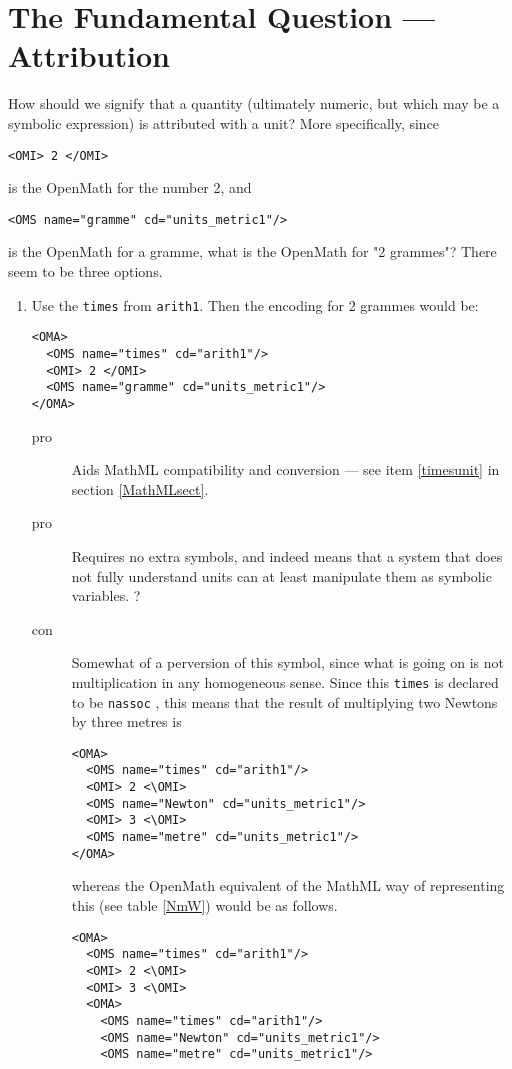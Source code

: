 \documentclass[11pt]{openmathTN}
\begin{document}
\section{The Fundamental Question --- Attribution}\label{attributed}
How should we signify that a quantity (ultimately numeric, but which may be
a symbolic expression) is attributed with a unit? More specifically, since
\begin{verbatim}
<OMI> 2 </OMI>
\end{verbatim}
is the OpenMath for the number 2, and
\begin{verbatim}
<OMS name="gramme" cd="units_metric1"/>
\end{verbatim}
is the OpenMath for a gramme, what is the OpenMath for "2 grammes"? There
seem to be three options.
\begin{enumerate}
\item\label{timesoption}Use the {\tt times} from {\tt arith1}. Then
  the encoding for 2 grammes would be:
\begin{verbatim}
<OMA>
  <OMS name="times" cd="arith1"/>
  <OMI> 2 </OMI>
  <OMS name="gramme" cd="units_metric1"/>
</OMA>
\end{verbatim}
\begin{description}
\item[pro]Aids MathML compatibility and conversion --- see item
\ref{timesunit} in section \ref{MathMLsect}.
\item[pro]Requires no extra symbols, and indeed means that a system that
does not fully understand units can at least manipulate them as symbolic
variables. \cite{Khanin2001}?
\item[con]Somewhat of a perversion of this symbol, since what is going on
is not multiplication in any homogeneous sense. Since this {\tt times} is
declared to be {\tt nassoc} \cite{Davenport2000c}, this means that the
result of multiplying two Newtons by three metres is
\begin{verbatim}
<OMA>
  <OMS name="times" cd="arith1"/>
  <OMI> 2 <\OMI>
  <OMS name="Newton" cd="units_metric1"/>
  <OMI> 3 <\OMI>
  <OMS name="metre" cd="units_metric1"/>
</OMA>
\end{verbatim}
whereas the OpenMath equivalent of the MathML way of representing this (see
table \ref{NmW}) would be as follows.
\begin{verbatim}
<OMA>
  <OMS name="times" cd="arith1"/>
  <OMI> 2 <\OMI>
  <OMI> 3 <\OMI>
  <OMA>
    <OMS name="times" cd="arith1"/>
    <OMS name="Newton" cd="units_metric1"/>
    <OMS name="metre" cd="units_metric1"/>

\end{verbatim}
\end{description}
\end{enumerate}
\end{document}
